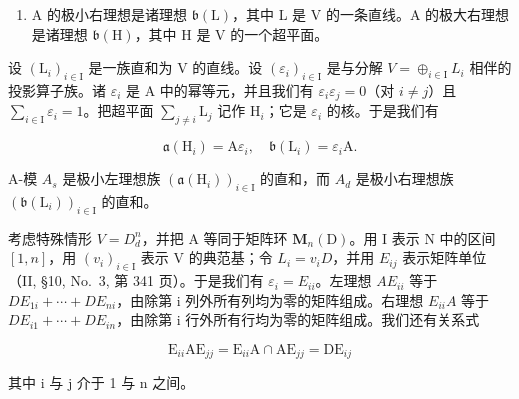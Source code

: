\begin{enumerate}
\def\labelenumi{\alph{enumi})}
\setcounter{enumi}{1}
\tightlist
\item
  A 的极小右理想是诸理想 \(\mathfrak{b}(\mathrm{L})\)，其中 L 是 V 的一条直线。A 的极大右理想是诸理想 \(\mathfrak{b}(\mathrm{H})\)，其中 H 是 V 的一个超平面。
\end{enumerate}

设 \((\mathrm{L}_{i})_{i\in\mathrm{I}}\) 是一族直和为 V 的直线。设 \((\varepsilon_{i})_{i\in\mathrm{I}}\) 是与分解 \(V=\oplus_{i\in\mathrm{I}}L_{i}\) 相伴的投影算子族。诸 \(\varepsilon_{i}\) 是 A 中的幂等元，并且我们有 \(\varepsilon_{i}\varepsilon_{j} = 0\)（对 \(i\neq j\)）且 \(\sum_{i\in \mathrm{I}}\varepsilon_i = 1\)。把超平面 \(\sum_{j\neq i}\mathrm{L}_j\) 记作 \(\mathrm{H}_i\)；它是 \(\varepsilon_{i}\) 的核。于是我们有

\[
\mathfrak {a} (\mathrm{H} _ {i}) = \mathrm{A}   \varepsilon_ {i}  , \quad \mathfrak {b} (\mathrm{L} _ {i}) = \varepsilon_ {i}   \mathrm{A}  .
\]

A-模 \(A_{s}\) 是极小左理想族 \((\mathfrak{a}(\mathrm{H}_{i}))_{i\in\mathrm{I}}\) 的直和，而 \(A_{d}\) 是极小右理想族 \((\mathfrak{b}(\mathrm{L}_{i}))_{i\in\mathrm{I}}\) 的直和。

考虑特殊情形 \(V = D_{d}^{n}\)，并把 A 等同于矩阵环 \(\mathbf{M}_{n}(\mathrm{D})\)。用 I 表示 N 中的区间 \([1, n]\)，用 \((v_{i})_{i \in \mathrm{I}}\) 表示 V 的典范基；令 \(L_{i} = v_{i}D\)，并用 \(E_{ij}\) 表示矩阵单位（II, §10, No.~3, 第 341 页）。于是我们有 \(\varepsilon_{i} = E_{ii}\)。左理想 \(AE_{ii}\) 等于 \(DE_{1i} + \cdots + DE_{ni}\)，由除第 i 列外所有列均为零的矩阵组成。右理想 \(E_{ii}A\) 等于 \(DE_{i1} + \cdots + DE_{in}\)，由除第 i 行外所有行均为零的矩阵组成。我们还有关系式

\[
\mathrm{E} _ {i i} \mathrm{AE} _ {j j} = \mathrm{E} _ {i i} \mathrm{A} \cap \mathrm{AE} _ {j j} = \mathrm{DE} _ {i j}
\]

其中 i 与 j 介于 1 与 n 之间。

